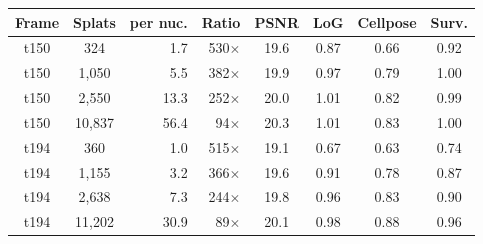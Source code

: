 \begin{tabular}{ccrrcccc}
\toprule
Frame & Splats & per nuc. & Ratio & PSNR & LoG & Cellpose & Surv. \\
\midrule
t150 & 324 & 1.7 & 530$\times$ & 19.6 & 0.87 & 0.66 & 0.92 \\
t150 & 1{,}050 & 5.5 & 382$\times$ & 19.9 & 0.97 & 0.79 & 1.00 \\
t150 & 2{,}550 & 13.3 & 252$\times$ & 20.0 & 1.01 & 0.82 & 0.99 \\
t150 & 10{,}837 & 56.4 & 94$\times$ & 20.3 & 1.01 & 0.83 & 1.00 \\
\midrule
t194 & 360 & 1.0 & 515$\times$ & 19.1 & 0.67 & 0.63 & 0.74 \\
t194 & 1{,}155 & 3.2 & 366$\times$ & 19.6 & 0.91 & 0.78 & 0.87 \\
t194 & 2{,}638 & 7.3 & 244$\times$ & 19.8 & 0.96 & 0.83 & 0.90 \\
t194 & 11{,}202 & 30.9 & 89$\times$ & 20.1 & 0.98 & 0.88 & 0.96 \\
\bottomrule
\end{tabular}
